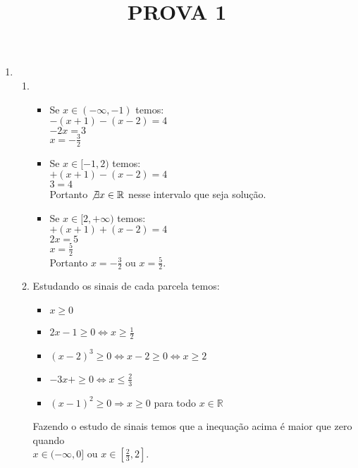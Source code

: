\documentclass[12pt]{article}
\title{PROVA 1}
\begin{document}
 

\maketitle
\begin{enumerate}


\item
 \begin{enumerate}
 \item
  \begin{itemize}
  \item Se $x\in(-\infty,-1)$ temos:\\
  $-(x+1)-(x-2)=4$\\
  $-2x=3$\\
  $x=- \frac{3}{2}$\\
  \item Se $x\in[-1,2)$ temos:\\
  $+(x+1)-(x-2)=4$\\
  $3=4$\\
  Portanto $\not\exists x\in \mathbb{R}$ nesse intervalo que seja solução.\\
  \item Se  $x\in[2,+\infty)$ temos:\\
  $+(x+1)+(x-2)=4$\\
  $2x=5$\\
  $x=\frac{5}{2}$\\
  Portanto $x=- \frac{3}{2}$ ou $x=\frac{5}{2}$.\\
  \end{itemize}

 \item Estudando os sinais de cada parcela temos:
  \begin{itemize}
   \item $x\geq0$\\
   \item $2x-1\geq0 \Leftrightarrow x\geq\frac{1}{2}$\\
   \item $(x-2)^3\geq0 \Leftrightarrow x-2\geq0 \Leftrightarrow x\geq2$\\
   \item $-3x+\geq0 \Leftrightarrow x\leq\frac{2}{3}$\\
   \item $(x-1)^2\geq0 \Rightarrow x\geq 0$ para todo $x\in\mathbb{R}$\\
  \end{itemize}
 Fazendo o estudo de sinais temos que a inequação acima é maior que zero quando\\ $x\in(-\infty,0]$ ou $x\in[\frac{2}{3},2]$.\\


\end{enumerate}
\end{enumerate}
\end{document}
